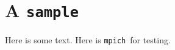\newcommand{\commentOut}[1]{{}}
\newcommand{\FooBar}{{}}

\def\MPI/{MPI}

\def\mpich{{\tt mpich}}

\section{A {\tt sample}}\label{Sample-doc}

Here is some text.  Here is \mpich\ for testing.
%
%
%


